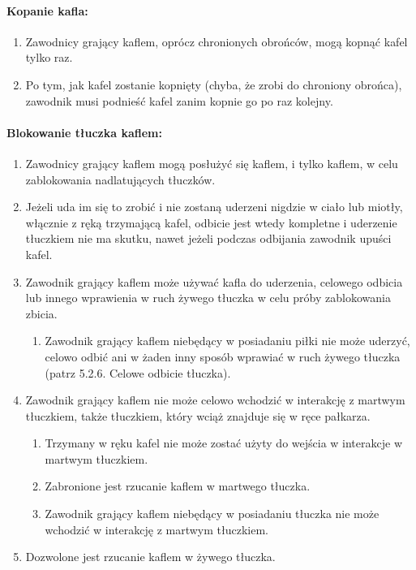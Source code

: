 \documentclass[12pt]{article}
\begin{document}
\paragraph{Kopanie kafla:}

\begin{enumerate}
	\item
	      Zawodnicy grający kaflem, oprócz chronionych obrońców, mogą kopnąć
	      kafel tylko raz.
	\item
	      Po tym, jak kafel zostanie kopnięty (chyba, że zrobi do chroniony
	      obrońca), zawodnik musi podnieść kafel zanim kopnie go po raz kolejny.
\end{enumerate}

\paragraph{Blokowanie tłuczka kaflem: }

\begin{enumerate}
	\item
	      Zawodnicy grający kaflem mogą posłużyć się kaflem, i tylko kaflem, w
	      celu zablokowania nadlatujących tłuczków.
	\item
	      Jeżeli uda im się to zrobić i nie zostaną uderzeni nigdzie w ciało lub
	      miotły, włącznie z ręką trzymającą kafel, odbicie jest wtedy kompletne
	      i uderzenie tłuczkiem nie ma skutku, nawet jeżeli podczas odbijania
	      zawodnik upuści kafel.
	\item
	      Zawodnik grający kaflem może używać kafla do uderzenia, celowego
	      odbicia lub innego wprawienia w ruch żywego tłuczka w celu próby
	      zablokowania zbicia.

	      \begin{enumerate}
		      \item
		            Zawodnik grający kaflem niebędący w posiadaniu piłki nie może
		            uderzyć, celowo odbić ani w żaden inny sposób wprawiać w ruch żywego
		            tłuczka (patrz 5.2.6. Celowe odbicie tłuczka).
	      \end{enumerate}
	\item
	      Zawodnik grający kaflem nie może celowo wchodzić w interakcję z
	      martwym tłuczkiem, także tłuczkiem, który wciąż znajduje się w ręce
	      pałkarza.

	      \begin{enumerate}
		      \item
		            Trzymany w ręku kafel nie może zostać użyty do wejścia w interakcje
		            w martwym tłuczkiem.
		      \item
		            Zabronione jest rzucanie kaflem w martwego tłuczka.
		      \item
		            Zawodnik grający kaflem niebędący w posiadaniu tłuczka nie może
		            wchodzić w interakcję z martwym tłuczkiem.
	      \end{enumerate}
	\item
	      Dozwolone jest rzucanie kaflem w żywego tłuczka.
\end{enumerate}
\end{document}
